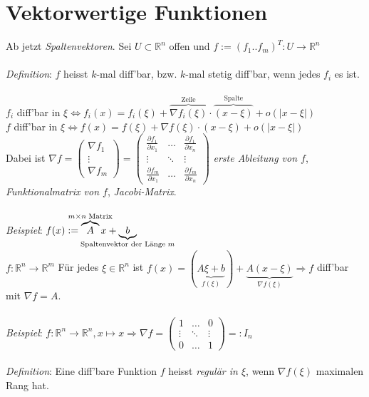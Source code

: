 \documentclass[12pt,a4paper,titlepage]{article}
\renewcommand{\d}{\partial}
\newcommand{\setR}{\mathbb{R}}
\begin{document}
\section*{Vektorwertige Funktionen}
Ab jetzt \emph{Spaltenvektoren}. Sei $U\subset\setR^n$ offen und $f:=(f_1..f_m)^T:U\to\setR^n$ \\
\\
\textit{Definition}: $f$ heisst $k$-mal diff'bar, bzw. $k$-mal stetig diff'bar, wenn jedes $f_i$ es ist. \\
\\
$f_i$ diff'bar in $\xi \iff f_i(x)=f_i(\xi)+\overbrace{\nabla f_i(\xi)}^{\text{Zeile}}\cdot \overbrace{(x-\xi)}^{\text{Spalte}}+o(|x-\xi|)$ \\
$f$ diff'bar in $\xi \iff f(x)=f(\xi)+\nabla f(\xi)\cdot (x-\xi)+o(|x-\xi|)$ \\
Dabei ist $\nabla f=\begin{pmatrix}\nabla f_1 \\ \vdots \\ \nabla f_m\end{pmatrix}=
\begin{pmatrix}
  \frac{\d f_1}{\d x_1} & \hdots & \frac{\d f_1}{\d x_n} \\
  \vdots & \ddots & \vdots \\
  \frac{\d f_m}{\d x_1} & \hdots & \frac{\d f_m}{\d x_n}
\end{pmatrix}$ \emph{erste Ableitung von $f$}, \emph{Funktionalmatrix von $f$}, \emph{Jacobi-Matrix}. \\
\\
\textit{Beispiel}: $f(x):=\overbrace{A}^{\mathclap{m\times n\;\text{Matrix}}}x+\underbrace{b}_{\mathclap{\text{Spaltenvektor der Länge}\;m}}$ \\
$f:\setR^n\to\setR^m$ Für jedes $\xi\in\setR^n$ ist $f(x)=(\underbrace{A\xi+b}_{f(\xi)})+\underbrace{A(x-\xi)}_{\nabla f(\xi)} \Rightarrow f$ diff'bar mit $\nabla f=A$. \\
\\
\textit{Beispiel}: $f:\setR^n\to\setR^n, x\mapsto x \Rightarrow \nabla f=\begin{pmatrix}1 & \hdots & 0 \\ \vdots & \ddots & \vdots \\ 0 & \hdots & 1\end{pmatrix}=: I_n$ \\
\\
\textit{Definition}: Eine diff'bare Funktion $f$ heisst \emph{regulär in $\xi$}, wenn $\nabla f(\xi)$ maximalen Rang hat. \\
\end{document}
